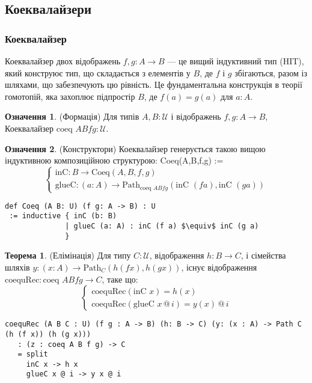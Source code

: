 \documentclass{article}
\theoremstyle{definition}
\newtheorem{theorem}{Теорема}
\newtheorem{definition}{Означення}
\begin{document}
\newpage
\subsection{Коеквалайзери}
\subsubsection*{Коеквалайзер}
Коеквалайзер двох відображень \( f, g : A \to B \) — це вищий індуктивний
тип (HIT), який конструює тип, що складається з елементів у \( B \),
де \( f \) і \( g \) збігаються, разом із шляхами, що забезпечують цю рівність.
Це фундаментальна конструкція в теорії гомотопій,
яка захоплює підпростір \( B \), де \( f(a) = g(a) \) для \( a : A \).

\begin{definition} (Формація)
Для типів \( A, B : \mathcal{U} \) і відображень \( f, g : A \to B \),
Коеквалайзер \( \text{coeq } A B f g : \mathcal{U} \).
\end{definition}

\begin{definition} (Конструктори)
Коеквалайзер генерується такою вищою індуктивною композиційною структурою:
Coeq(A,B,f,g) :=
\[
\begin{cases}
\text{inC} : B \to \text{Coeq}(A,B,f,g) \\
\text{glueC} : (a : A) \to \text{Path}_{\text{coeq } A B f g} (\text{inC } (f a), \text{inC } (g a))
\end{cases}
\]
\begin{lstlisting}[mathescape=true]
def Coeq (A B: U) (f g: A -> B) : U
 := inductive { inC (b: B)
              | glueC (a: A) : inC (f a) $\equiv$ inC (g a)
              }
\end{lstlisting}
\end{definition}

\begin{theorem} (Елімінація)
Для типу \( C : \mathcal{U} \), відображення \( h : B \to C \), і сімейства шляхів \( y : (x : A) \to \text{Path}_C (h (f x), h (g x)) \), існує відображення \( \text{coequRec} : \text{coeq } A B f g \to C \), таке що:
\[
\begin{cases}
\text{coequRec}(\text{inC } x) = h(x) \\
\text{coequRec}(\text{glueC } x \, @ \, i) = y(x) \, @ \, i
\end{cases}
\]
\begin{lstlisting}
coequRec (A B C : U) (f g : A -> B) (h: B -> C) (y: (x : A) -> Path C (h (f x)) (h (g x)))
   : (z : coeq A B f g) -> C
   = split
     inC x -> h x
     glueC x @ i -> y x @ i
\end{lstlisting}
\end{theorem}
\end{document}
